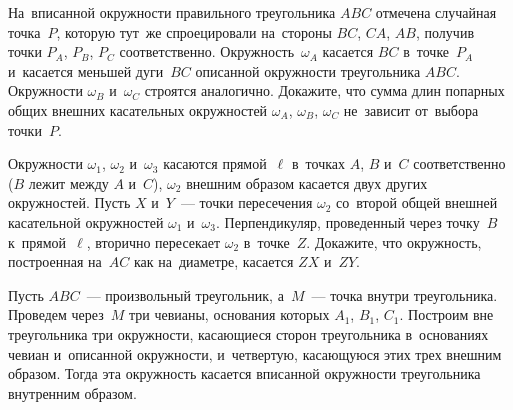 \begin{problems}
\item
На~вписанной окружности правильного треугольника $ABC$ отмечена случайная
точка~$P$, которую тут~же спроецировали на~стороны $BC$, $CA$, $AB$, получив
точки $P_{A}$, $P_{B}$, $P_{C}$ соответственно.
Окружность~$\omega_A$ касается $BC$ в~точке~$P_{A}$ и~касается меньшей
дуги~$BC$ описанной окружности треугольника $ABC$.
Окружности $\omega_B$ и~$\omega_C$ строятся аналогично.
Докажите, что сумма длин попарных общих внешних касательных окружностей
$\omega_A$, $\omega_B$, $\omega_C$ не~зависит от~выбора точки~$P$.

\item
Окружности $\omega_1$, $\omega_2$ и~$\omega_3$ касаются прямой~$\ell$
в~точках $A$, $B$ и~$C$ соответственно ($B$ лежит между $A$ и~$C$),
$\omega_2$ внешним образом касается двух других окружностей.
Пусть $X$ и~$Y$~--- точки пересечения $\omega_2$ со~второй общей внешней
касательной окружностей $\omega_1$ и~$\omega_3$.
Перпендикуляр, проведенный через точку~$B$ к~прямой~$\ell$, вторично пересекает
$\omega_2$ в~точке~$Z$.
Докажите, что окружность, построенная на~$AC$ как на~диаметре, касается
$ZX$ и~$ZY$.

\item
Пусть $ABC$~--- произвольный треугольник, а~$M$~--- точка внутри треугольника.
Проведем через~$M$ три чевианы, основания которых $A_{1}$, $B_{1}$, $C_{1}$.
Построим вне треугольника три окружности, касающиеся сторон треугольника
в~основаниях чевиан и~описанной окружности, и~четвертую, касающуюся этих трех
внешним образом.
Тогда эта окружность касается вписанной окружности треугольника внутренним
образом.

\end{problems}

